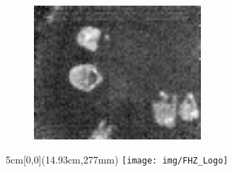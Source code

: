 \documentclass[
	a4paper
]{scrartcl}
\begin{document}
\begin{figure}[H]
	\includegraphics[height=5cm]{exampleIRImage}
\end{figure}

\vspace{0.5em}
\noindent
\begin{textblock*}{5cm}[0,0](14.93cm,277mm)
	\texttt{[image: img/FHZ\_Logo]}
\end{textblock*}
\end{document}
